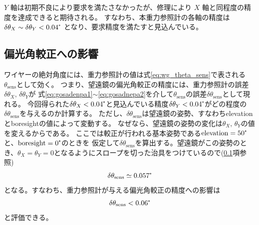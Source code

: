 \documentclass[../../main.tex]{subfiles}
\begin{document}
$Y$ 軸は初期不良により要求を満たさなかったが、修理により $X$ 軸と同程度の精度を達成できると期待される。
すなわち、本重力参照計の各軸の精度は $\delta\theta_X\sim\delta\theta_Y<0.04\tcdegree$ となり、要求精度を満たすと見込んでいる。

\subsection{偏光角較正への影響}
ワイヤーの絶対角度には、重力参照計の値は式\eqref{eq:wg_theta_sens}で表される$\theta_{\mathrm{sens}}$として効く。
つまり、望遠鏡の偏光角較正の精度には、重力参照計の誤差$\delta\theta_{X},\,\delta\theta_{Y}$が
式\eqref{eq:gosadenpa1}$\sim$\eqref{eq:gosadnepa2}を介して$\theta_{\mathrm{sens}}$の誤差$\delta\theta_{\mathrm{sens}}$として現れる。
今回得られた$\delta\theta_{X}<0.04\tcdegree$と見込んでいる精度$\delta\theta_{Y}<0.04\tcdegree$がどの程度の$\delta\theta_{\mathrm{sens}}$を与えるのか計算する。
ただし、$\delta\theta_{\mathrm{sens}}$は望遠鏡の姿勢、すなわちelevationとboresightの値によって変動する。
なぜなら、望遠鏡の姿勢の変化は$\theta_{X},\,\theta_{Y}$の値を変えるからである。
ここでは較正が行われる基本姿勢である$\mathrm{elevation}=50\tcdegree$と、$\mathrm{boresight}=0\tcdegree$のときを
仮定して$\delta\theta_{\mathrm{sens}}$を算出する。望遠鏡がこの姿勢のとき、$\theta_{X}=\theta_{Y}=0$となるようにスロープを切った治具をつけているので(\ref{}項参照)
\begin{equation}
    \delta\theta_{\mathrm{sens}} \simeq 0.057\tcdegree
\end{equation}
となる。すなわち、重力参照計が与える偏光角較正の精度への影響は
\begin{equation}
    \delta\theta_{\mathrm{sens}} < 0.06\tcdegree
\end{equation}
と評価できる。
\end{document}
